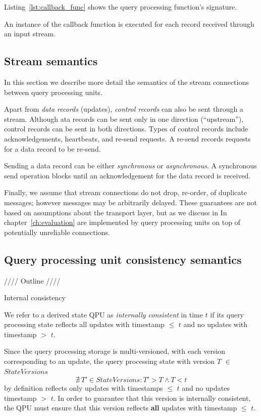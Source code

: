\noindent
Listing~\ref{lst:callback_func} shows the query processing function's signature.

An instance of the callback function is executed for each record received through an input stream.

\subsection{Stream semantics}

In this section we describe more detail the semantics of the stream connections between query processing units.

\medskip
\noindent
Apart from \textit{data records} (updates), \textit{control records} can also be sent through a stream.
Although ata records can be sent only in one direction (``upstream''), control records can be sent in both directions.
Types of control records include acknowledgements, heartbeats, and re-send requests.
A re-send records requests for a data record to be re-send.

\medskip
\noindent
Sending a data record can be either \textit{synchronous} or \textit{asynchronous}.
A synchronous send operation blocks until an acknowledgement for the data record is received.

\medskip
\noindent
Finally, we assume that stream connections do not drop, re-order, of duplicate messages;
however messages may be arbitrarily delayed.
These guarantees are not based on assumptions about the transport layer, but as we discuss in In chapter~\ref{ch:evaluation}
are implemented by query processing units on top of potentially unreliable connections.


\subsection{Query processing unit consistency semantics}

//// Outline ////

\noindent
Internal consistency

\noindent
We refer to a derived state QPU as \textit{internally consistent} in time $t$ if its query processing state
reflects all updates with timestamp $\leq$ $t$ and no updates with timestamp $>$ $t$.

Since the query processing storage is multi-versioned, with each version corresponding to an update,
the query processing state with version $T$ $\in$ $StateVersions$
\[
  \nexists~T' \in StateVersions : T' > T \land T < t
\]
by definition reflects only updates with timestamps $\leq$ $t$ and no updates timestamp $>$ $t$.
In order to guarantee that this version is internally consistent, the QPU must ensure that this version reflects
\textbf{all} updates with timestamp $\leq$ $t$.

